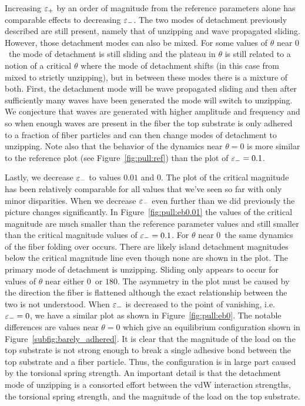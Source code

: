 {Increasing $\varepsilon_+$ by an order of magnitude from the reference parameters alone has comparable effects to decreasing $\varepsilon_-$. The two modes of detachment previously described are still present, namely that of unzipping and wave propagated sliding. However, those detachment modes can also be mixed. For some values of $\theta$ near $0$\textdegree\ the mode of detachment is still sliding and the plateau in $\theta$ is still related to a notion of a critical $\theta$ where the mode of detachment shifts (in this case from mixed to strictly unzipping), but in between these modes there is a mixture of both. First, the detachment mode will be wave propagated sliding and then after sufficiently many waves have been generated the mode will switch to unzipping. We conjecture that waves are generated with higher amplitude and frequency and so when enough waves are present in the fiber the top substrate is only adhered to a fraction of fiber particles and can then change modes of detachment to unzipping. Note also that the behavior of the dynamics near $\theta=0$ is more similar to the reference plot (see Figure~\ref{fig:pull:ref}) than the plot of $\varepsilon_-=0.1$.

Lastly, we decrease $\varepsilon_-$ to values $0.01$ and $0$. The plot of the critical magnitude has been relatively comparable for all values that we've seen so far with only minor disparities. When we decrease $\varepsilon_-$ even further than we did previously the picture changes significantly. In Figure~\ref{fig:pull:eb0.01} the values of the critical magnitude are much smaller than the reference parameter values and still smaller than the critical magnitude values of $\varepsilon_-=0.1$. For $\theta$ near $0$\textdegree\ the same dynamics of the fiber folding over occurs. There are likely island detachment magnitudes below the critical magnitude line even though none are shown in the plot. The primary mode of detachment is unzipping. Sliding only appears to occur for values of $\theta$ near either $0$\textdegree\ or $180$\textdegree. The asymmetry in the plot must be caused by the direction the fiber is flattened although the exact relationship between the two is not understood. When $\varepsilon_-$ is decreased to the point of vanishing, i.e. $\varepsilon_-=0$, we have a similar plot as shown in Figure~\ref{fig:pull:eb0}. The notable differences are values near $\theta=0$ which give an equilibrium configuration shown in Figure~\ref{subfig:barely_adhered}. It is clear that the magnitude of the load on the top substrate is not strong enough to break a single adhesive bond between the top substrate and a fiber particle. Thus, the configuration is in large part caused by the torsional spring strength. An important detail is that the detachment mode of unzipping is a consorted effort between the vdW interaction strengths, the torsional spring strength, and the magnitude of the load on the top substrate.

}
